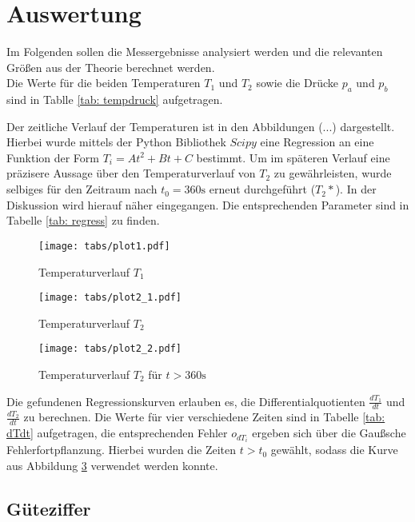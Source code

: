 \section{Auswertung}
Im Folgenden sollen die Messergebnisse analysiert werden und die relevanten Größen aus der Theorie berechnet werden. \\
Die Werte für die beiden Temperaturen $T_1$ und $T_2$ sowie die Drücke $p_a$ und $p_b$ sind in Tablle \ref{tab: tempdruck} aufgetragen.
\FloatBarrier

\FloatBarrier
Der zeitliche Verlauf der Temperaturen ist in den Abbildungen (...) dargestellt. Hierbei wurde mittels der Python Bibliothek $Scipy$ eine
Regression an eine Funktion der Form $T_i = A t^2 + B t + C$ bestimmt. Um im späteren Verlauf eine präzisere Aussage über den Temperaturverlauf
von $T_2$ zu gewährleisten, wurde selbiges für den Zeitraum nach $t_0 = 360 \si{\second}$ erneut durchgeführt ($T_2*$). In der Diskussion wird hierauf näher eingegangen. Die entsprechenden
Parameter sind in Tabelle \ref{tab: regress} zu finden. \\


\begin{figure}
  \centering
  \texttt{[image: tabs/plot1.pdf]}
  \caption{Temperaturverlauf $T_1$}
  \label{fig: plot1}
\end{figure}

\begin{figure}
  \centering
  \texttt{[image: tabs/plot2\_1.pdf]}
  \caption{Temperaturverlauf $T_2$}
  \label{fig: plot2}
\end{figure}

\begin{figure}
  \centering
  \texttt{[image: tabs/plot2\_2.pdf]}
  \caption{Temperaturverlauf $T_2$ für $t > 360 \si{\second}$}
  \label{fig: plot2*}
\end{figure}


Die gefundenen Regressionskurven erlauben es, die Differentialquotienten $\frac{dT_1}{dt}$ und $\frac{dT_2}{dt}$ zu berechnen. Die Werte für vier verschiedene Zeiten sind
in Tabelle \ref{tab: dTdt} aufgetragen, die entsprechenden Fehler $o_{dT_i}$ ergeben sich über die Gaußsche Fehlerfortpflanzung. Hierbei wurden die Zeiten $t > t_0$ gewählt, sodass die Kurve aus Abbildung \ref{fig: plot2*} verwendet werden konnte.

\subsection{Güteziffer}

